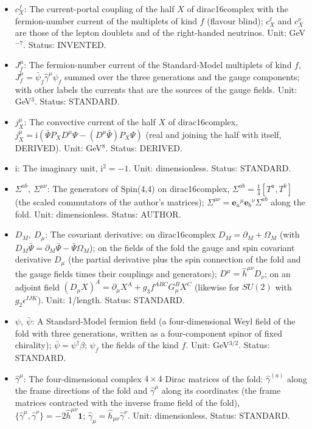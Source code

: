 \documentclass[
  10pt,
]{article}
\begin{document}
\begin{itemize}
  \(f \in \{Q, u, d, \ell, e, \nu\}\) (quark doublets, up-quark
  singlets, down-quark singlets, lepton doublets, charged-lepton
  singlets, right-handed neutrinos); a sum over \(f\) runs over the six.
  Status: STANDARD.
\item
  \(c^{f}_X\): The current-portal coupling of the half \(X\) of
  dirac16complex with the fermion-number current of the multiplets of
  kind \(f\) (flavour blind); \(c^{\ell}_X\) and \(c^{\nu}_X\) are those
  of the lepton doublets and of the right-handed neutrinos. Unit:
  GeV\(^{-7}\). Status: INVENTED.
\item
  \(J_f^\mu\): The fermion-number current of the Standard-Model
  multiplets of kind \(f\), \(J_f^\mu = \bar\psi_f\hat\gamma^\mu\psi_f\)
  summed over the three generations and the gauge components; with other
  labels the currents that are the sources of the gauge fields. Unit:
  GeV\(^3\). Status: STANDARD.
\item
  \(j_X^\mu\): The convective current of the half \(X\) of
  dirac16complex,
  \(j_X^\mu = \mathrm{i}(\bar\Psi P_XD^\mu\Psi - (D^\mu\bar\Psi)P_X\Psi)\)
  (real and joining the half with itself, DERIVED). Unit: GeV\(^8\).
  Status: DERIVED.
\item
  \(\mathrm{i}\): The imaginary unit, \(\mathrm{i}^2 = -1\). Unit:
  dimensionless. Status: STANDARD.
\item
  \(\Sigma^{ab},\ \Sigma^{\mu\nu}\): The generators of Spin(4,4) on
  dirac16complex, \(\Sigma^{ab} = \frac14[T^a, T^b]\) (the scaled
  commutators of the author's matrices);
  \(\Sigma^{\mu\nu} = \mathbf{e}_a{}^\mu\mathbf{e}_b{}^\nu\Sigma^{ab}\)
  along the fold. Unit: dimensionless. Status: AUTHOR.
\item
  \(D_M,\ D_\mu\): The covariant derivative: on dirac16complex
  \(D_M = \partial_M + \Omega_M\) (with
  \(D_M\bar\Psi = \partial_M\bar\Psi - \bar\Psi\Omega_M\)); on the
  fields of the fold the gauge and spin covariant derivative \(D_\mu\)
  (the partial derivative plus the spin connection of the fold and the
  gauge fields times their couplings and generators);
  \(D^\mu = \hat h^{\mu\nu}D_\nu\); on an adjoint field
  \((D_\mu X)^A = \partial_\mu X^A + g_3f^{ABC}G^B_\mu X^C\) (likewise
  for \(SU(2)\) with \(g_2\epsilon^{IJK}\)). Unit: 1/length. Status:
  STANDARD.
\item
  \(\psi,\ \bar\psi\): A Standard-Model fermion field (a
  four-dimensional Weyl field of the fold with three generations,
  written as a four-component spinor of fixed chirality);
  \(\bar\psi = \psi^\dagger\beta\); \(\psi_f\) the fields of the kind
  \(f\). Unit: GeV\(^{3/2}\). Status: STANDARD.
\item
  \(\hat\gamma^\mu\): The four-dimensional complex \(4 \times 4\) Dirac
  matrices of the fold: \(\hat\gamma^{(a)}\) along the frame directions
  of the fold and \(\hat\gamma^\mu\) along its coordinates (the frame
  matrices contracted with the inverse frame field of the fold),
  \(\{\hat\gamma^\mu, \hat\gamma^\nu\} = -2\hat h^{\mu\nu}\mathbf{1}\);
  \(\hat\gamma_\mu = \hat h_{\mu\nu}\hat\gamma^\nu\). Unit:
  dimensionless. Status: STANDARD.
\end{itemize}
\end{document}
